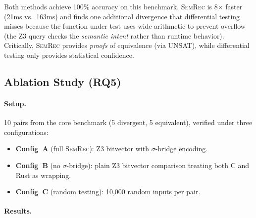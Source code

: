 \documentclass[11pt,a4paper]{article}
\begin{document}
Both methods achieve 100\% accuracy on this benchmark.
\textsc{SemRec} is 8$\times$ faster (21ms vs.\ 163ms) and finds
one additional divergence that differential testing misses because
the function under test uses wide arithmetic to prevent overflow
(the Z3 query checks the \emph{semantic intent} rather than runtime
behavior).  Critically, \textsc{SemRec} provides \emph{proofs} of
equivalence (via UNSAT), while differential testing only provides
statistical confidence.

\subsection{Ablation Study (RQ5)}\label{sec:eval-ablation}

\paragraph{Setup.} 10 pairs from the core benchmark (5 divergent,
5 equivalent), verified under three configurations:
\begin{itemize}
  \item \textbf{Config~A} (full \textsc{SemRec}): Z3 bitvector with
    $\sigma$-bridge encoding.
  \item \textbf{Config~B} (no $\sigma$-bridge): plain Z3 bitvector
    comparison treating both C and Rust as wrapping.
  \item \textbf{Config~C} (random testing): 10,000 random inputs per pair.
\end{itemize}

\paragraph{Results.}
\end{document}
